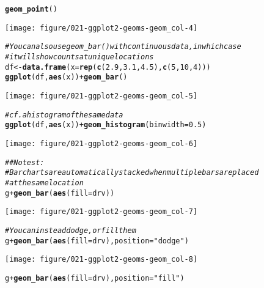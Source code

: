 \documentclass[a4paper,titlepage]{tufte-handout}\usepackage[]{graphicx}\usepackage[]{color}
\makeatletter
\def\maxwidth{ %
  \ifdim\Gin@nat@width>\linewidth
    \linewidth
  \else
    \Gin@nat@width
  \fi
}
\newcommand{\hlnum}[1]{\textcolor[rgb]{0.686,0.059,0.569}{#1}}%
\newcommand{\hlstr}[1]{\textcolor[rgb]{0.192,0.494,0.8}{#1}}%
\newcommand{\hlcom}[1]{\textcolor[rgb]{0.678,0.584,0.686}{\textit{#1}}}%
\newcommand{\hlopt}[1]{\textcolor[rgb]{0,0,0}{#1}}%
\newcommand{\hlstd}[1]{\textcolor[rgb]{0.345,0.345,0.345}{#1}}%
\newcommand{\hlkwb}[1]{\textcolor[rgb]{0.69,0.353,0.396}{#1}}%
\newcommand{\hlkwc}[1]{\textcolor[rgb]{0.333,0.667,0.333}{#1}}%
\newcommand{\hlkwd}[1]{\textcolor[rgb]{0.737,0.353,0.396}{\textbf{#1}}}%
\newenvironment{kframe}{%
 \def\at@end@of@kframe{}%
 \ifinner\ifhmode%
  \def\at@end@of@kframe{\end{minipage}}%
  \begin{minipage}{\columnwidth}%
 \fi\fi%
 \def\FrameCommand##1{\hskip\@totalleftmargin \hskip-\fboxsep
 \colorbox{shadecolor}{##1}\hskip-\fboxsep
     \hskip-\linewidth \hskip-\@totalleftmargin \hskip\columnwidth}%
 \MakeFramed {\advance\hsize-\width
   \@totalleftmargin\z@ \linewidth\hsize
   \@setminipage}}%
 {\par\unskip\endMakeFramed%
 \at@end@of@kframe}
\newenvironment{knitrout}{}{} %
\makeatother
\begin{document}
\begin{knitrout}
\begin{kframe}
\begin{alltt}
  \hlkwd{geom_point}\hlstd{()}
\end{alltt}
\end{kframe}
\texttt{[image: figure/021-ggplot2-geoms-geom\_col-4]} 
\begin{kframe}\begin{alltt}
\hlcom{# You can also use geom_bar() with continuous data, in which case}
\hlcom{# it will show counts at unique locations}
\hlstd{df} \hlkwb{<-} \hlkwd{data.frame}\hlstd{(}\hlkwc{x} \hlstd{=} \hlkwd{rep}\hlstd{(}\hlkwd{c}\hlstd{(}\hlnum{2.9}\hlstd{,} \hlnum{3.1}\hlstd{,} \hlnum{4.5}\hlstd{),} \hlkwd{c}\hlstd{(}\hlnum{5}\hlstd{,} \hlnum{10}\hlstd{,} \hlnum{4}\hlstd{)))}
\hlkwd{ggplot}\hlstd{(df,} \hlkwd{aes}\hlstd{(x))} \hlopt{+} \hlkwd{geom_bar}\hlstd{()}
\end{alltt}
\end{kframe}
\texttt{[image: figure/021-ggplot2-geoms-geom\_col-5]} 
\begin{kframe}\begin{alltt}
\hlcom{# cf. a histogram of the same data}
\hlkwd{ggplot}\hlstd{(df,} \hlkwd{aes}\hlstd{(x))} \hlopt{+} \hlkwd{geom_histogram}\hlstd{(}\hlkwc{binwidth} \hlstd{=} \hlnum{0.5}\hlstd{)}
\end{alltt}
\end{kframe}
\texttt{[image: figure/021-ggplot2-geoms-geom\_col-6]} 
\begin{kframe}\begin{alltt}
\hlcom{## No test: }
\hlcom{# Bar charts are automatically stacked when multiple bars are placed}
\hlcom{# at the same location}
\hlstd{g} \hlopt{+} \hlkwd{geom_bar}\hlstd{(}\hlkwd{aes}\hlstd{(}\hlkwc{fill} \hlstd{= drv))}
\end{alltt}
\end{kframe}
\texttt{[image: figure/021-ggplot2-geoms-geom\_col-7]} 
\begin{kframe}\begin{alltt}
\hlcom{# You can instead dodge, or fill them}
\hlstd{g} \hlopt{+} \hlkwd{geom_bar}\hlstd{(}\hlkwd{aes}\hlstd{(}\hlkwc{fill} \hlstd{= drv),} \hlkwc{position} \hlstd{=} \hlstr{"dodge"}\hlstd{)}
\end{alltt}
\end{kframe}
\texttt{[image: figure/021-ggplot2-geoms-geom\_col-8]} 
\begin{kframe}\begin{alltt}
\hlstd{g} \hlopt{+} \hlkwd{geom_bar}\hlstd{(}\hlkwd{aes}\hlstd{(}\hlkwc{fill} \hlstd{= drv),} \hlkwc{position} \hlstd{=} \hlstr{"fill"}\hlstd{)}

\end{alltt}
\end{kframe}
\end{knitrout}
\end{document}
